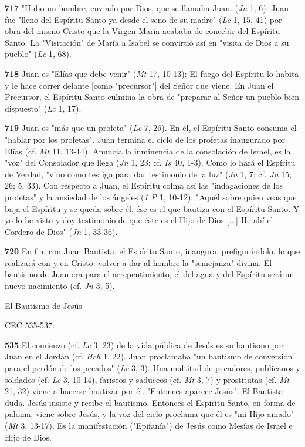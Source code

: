 \documentclass[]{article}
\begin{document}
\textbf{717} "Hubo un hombre, enviado por Dios, que se llamaba Juan.
(\emph{Jn} 1, 6). Juan fue "lleno del Espíritu Santo ya desde el seno de
su madre" (\emph{Lc} 1, 15. 41) por obra del mismo Cristo que la Virgen
María acababa de concebir del Espíritu Santo. La "Visitación" de María a
Isabel se convirtió así en "visita de Dios a su pueblo" (\emph{Lc} 1,
68).

\textbf{718} Juan es "Elías que debe venir" (\emph{Mt} 17, 10-13): El
fuego del Espíritu lo habita y le hace correr delante {[}como
"precursor"{]} del Señor que viene. En Juan el Precursor, el Espíritu
Santo culmina la obra de "preparar al Señor un pueblo bien dispuesto"
(\emph{Lc} 1, 17).

\textbf{719} Juan es "más que un profeta" (\emph{Lc} 7, 26). En él, el
Espíritu Santo consuma el "hablar por los profetas". Juan termina el
ciclo de los profetas inaugurado por Elías (cf. \emph{Mt} 11, 13-14).
Anuncia la inminencia de la consolación de Israel, es la "voz" del
Consolador que llega (\emph{Jn} 1, 23; cf. \emph{Is} 40, 1-3). Como lo
hará el Espíritu de Verdad, "vino como testigo para dar testimonio de la
luz" (\emph{Jn} 1, 7; cf. \emph{Jn} 15, 26; 5, 33). Con respecto a Juan,
el Espíritu colma así las "indagaciones de los profetas" y la ansiedad
de los ángeles (\emph{1 P} 1, 10-12): "Aquél sobre quien veas que baja
el Espíritu y se queda sobre él, ése es el que bautiza con el Espíritu
Santo. Y yo lo he visto y doy testimonio de que éste es el Hijo de Dios
{[}...{]} He ahí el Cordero de Dios" (\emph{Jn} 1, 33-36).

\textbf{720} En fin, con Juan Bautista, el Espíritu Santo, inaugura,
prefigurándolo, lo que realizará con y en Cristo: volver a dar al hombre
la "semejanza" divina. El bautismo de Juan era para el arrepentimiento,
el del agua y del Espíritu será un nuevo nacimiento (cf. \emph{Jn} 3,
5).

El Bautismo de Jesús

CEC 535-537:

\textbf{535} El comienzo (cf. \emph{Lc} 3, 23) de la vida pública de
Jesús es su bautismo por Juan en el Jordán (cf. \emph{Hch} 1, 22). Juan
proclamaba "un bautismo de conversión para el perdón de los pecados"
(\emph{Lc} 3, 3). Una multitud de pecadores, publicanos y soldados (cf.
\emph{Lc} 3, 10-14), fariseos y saduceos (cf. \emph{Mt} 3, 7) y
prostitutas (cf. \emph{Mt} 21, 32) viene a hacerse bautizar por él.
"Entonces aparece Jesús". El Bautista duda. Jesús insiste y recibe el
bautismo. Entonces el Espíritu Santo, en forma de paloma, viene sobre
Jesús, y la voz del cielo proclama que él es "mi Hijo amado" (\emph{Mt}
3, 13-17). Es la manifestación ("Epifanía") de Jesús como Mesías de
Israel e Hijo de Dios.
\end{document}
